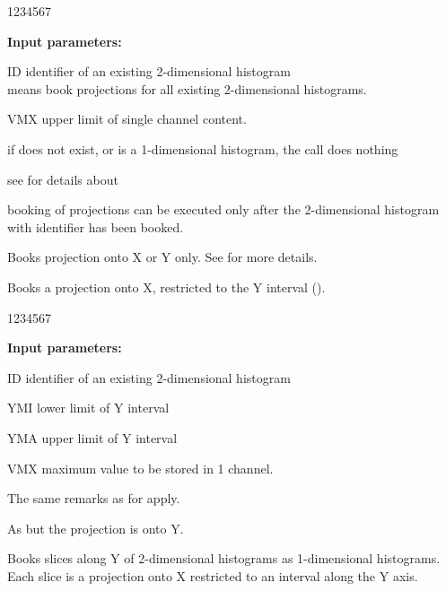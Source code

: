 \begin{DLttc}{1234567}
\item[{\rm\bf Input parameters:}]
\item[ID] identifier of an existing 2-dimensional histogram\\
           means book projections for all existing 2-dimensional
          histograms.
\item[VMX] upper limit of single channel content.
\end{DLttc}
\Remark
\begin{UL}
\item if  does not exist, or is a 1-dimensional histogram,
      the call does nothing
\item see  for details about 
\item booking of projections can be executed only after the
      2-dimensional histogram with identifier  has been booked.
\end{UL}

\Action Books projection onto X or Y only.
See  for more details.
\medskip


\Action Books a projection onto X, restricted to the Y interval
().

\begin{DLttc}{1234567}
\item[{\rm\bf Input parameters:}]
\item[ID] identifier of an existing 2-dimensional histogram
\item[YMI] lower limit of Y interval
\item[YMA] upper limit of Y interval
\item[VMX] maximum value to be stored in 1 channel.
\end{DLttc}
 
The same remarks as for  apply.
\medskip


\Action As  but the projection is onto Y.
\medskip


\Action Books slices along Y of 2-dimensional histograms as
 1-dimensional histograms.\\
Each slice is a projection onto X restricted to an interval
along the Y axis.

